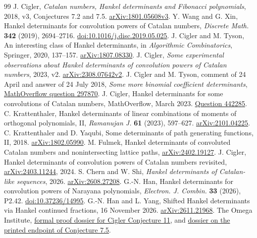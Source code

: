 \documentclass[11pt,a4paper]{article}
\begin{document}
\begin{thebibliography}{99}
 J. Cigler, \emph{Catalan numbers, Hankel determinants and Fibonacci polynomials}, 2018, v3, Conjectures 7.2 and 7.5. \href{https://arxiv.org/abs/1801.05608v3}{arXiv:1801.05608v3}.
 Y. Wang and G. Xin, Hankel determinants for convolution powers of Catalan numbers, \emph{Discrete Math.} \textbf{342} (2019), 2694--2716. \href{https://doi.org/10.1016/j.disc.2019.05.025}{doi:10.1016/j.disc.2019.05.025}.
 J. Cigler and M. Tyson, An interesting class of Hankel determinants, in \emph{Algorithmic Combinatorics}, Springer, 2020, 137--157. \href{https://arxiv.org/abs/1807.08330}{arXiv:1807.08330}.
 J. Cigler, \emph{Some experimental observations about Hankel determinants of convolution powers of Catalan numbers}, 2023, v2. \href{https://arxiv.org/abs/2308.07642v2}{arXiv:2308.07642v2}.
 J. Cigler and M. Tyson, comment of 24 April and answer of 24 July 2018, \emph{Some more binomial coefficient determinants}, \href{https://mathoverflow.net/questions/297870}{MathOverflow question 297870}.
 J. Cigler, Hankel determinants for some convolutions of Catalan numbers, MathOverflow, March 2023. \href{https://mathoverflow.net/questions/442285}{Question 442285}.
 C. Krattenthaler, Hankel determinants of linear combinations of moments of orthogonal polynomials, II, \emph{Ramanujan J.} \textbf{61} (2023), 597--627. \href{https://arxiv.org/abs/2101.04225}{arXiv:2101.04225}.
 C. Krattenthaler and D. Yaqubi, Some determinants of path generating functions, II, 2018. \href{https://arxiv.org/abs/1802.05990}{arXiv:1802.05990}.
 M. Fulmek, Hankel determinants of convoluted Catalan numbers and nonintersecting lattice paths, \href{https://arxiv.org/abs/2402.19127}{arXiv:2402.19127}. J. Cigler, Hankel determinants of convolution powers of Catalan numbers revisited, \href{https://arxiv.org/abs/2403.11244}{arXiv:2403.11244}, 2024.
 S. Chern and W. Shi, \emph{Hankel determinants of Catalan-like sequences}, 2026. \href{https://arxiv.org/abs/2608.27208}{arXiv:2608.27208}.
 G.-N. Han, Hankel determinants for convolution powers of Narayana polynomials, \emph{Electron. J. Combin.} \textbf{33} (2026), P2.42. \href{https://doi.org/10.37236/14995}{doi:10.37236/14995}.
 G.-N. Han and L. Yang, Shifted Hankel determinants via Hankel continued fractions, 16 November 2026. \href{https://arxiv.org/abs/2611.21968}{arXiv:2611.21968}.
 The Omega Institute, \href{https://www.trureturing.org/research/cigler-catalan-power-shifted-hankel/}{formal proof dossier for Cigler Conjecture 11}, and \href{https://www.trureturing.org/knowledge/node/c875051dc1dd7194f09bc1f09b598c9e682cdba01056d248b04dfcb03c3a82c1/}{dossier on the printed endpoint of Conjecture 7.5}.

\end{thebibliography}
\end{document}
